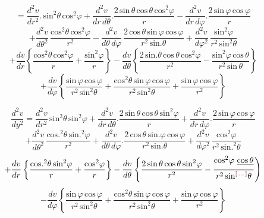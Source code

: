 \documentclass[11pt,a4paper]{article}
\begin{document}
\[ = \frac{d^{2}v}{dr^{2}}.\,\text{sin}^{2}\theta\,\text{cos}^{2}\varphi + \frac{d^{2}v}{dr\,d\theta}.\frac{2\,\text{sin}\,\theta\,\text{cos}\,\theta\,\text{cos}^{2}\varphi}{r} - \frac{d^{2}v}{dr\,d\varphi}.\frac{2\,\text{sin}\,\varphi\,\text{cos}\,\varphi}{r} \]
\[ + \frac{d^{2}v}{d\theta^{2}}\,\frac{\text{cos}^{2}\theta\,\text{cos}^{2}\varphi}{r^{2}} - \frac{d^{2}v}{d\theta\,d\varphi}\,\frac{2\,\text{cos}\,\theta\,\text{sin}\,\varphi\,\text{cos}\,\varphi}{r^{2}\,\text{sin.}\theta} + \frac{d^{2}v}{d\varphi^{2}}\,\frac{\text{sin}^{2}\varphi}{r^{2}\,\text{sin}^{2}\theta} \]
\[ + \frac{dv}{dr}\left\{\frac{\text{cos}^{2}\theta\,\text{cos}^{2}\varphi}{r} + \frac{\text{sin}^{2}\varphi}{r}\right\} - \frac{dv}{d\theta}\left\{\frac{2\,\text{sin.}\theta\,\text{cos}\,\theta\,\text{cos}^{2}\varphi}{r^{2}} - \frac{\text{sin}^{2}\varphi\,\text{cos}\,\theta}{r^{2}\,\text{sin}\,\theta}\right\} \]
\[ + \frac{dv}{d\varphi}\left\{\frac{\text{sin}\,\varphi\,\text{cos}\,\varphi}{r^{2}\,\text{sin}^{2}\theta} + \frac{\text{cos}^{2}\theta\,\text{sin}\,\varphi\,\text{cos}\,\varphi}{r^{2}\,\text{sin}^{2}\theta} + \frac{\text{sin}\,\varphi\,\text{cos}\,\varphi}{r^{2}}\right\} \]

\[ \frac{d^{2}v}{dy^{2}} = \frac{d^{2}v}{dr^{2}}\,\text{sin}^{2}\theta\,\text{sin}^{2}\varphi + \frac{d^{2}v}{dr\,d\theta}.\frac{2\,\text{sin}\,\theta\,\text{cos}\,\theta\,\text{sin}^{2}\varphi}{r} + \frac{d^{2}v}{dr\,d\varphi}.\frac{2\,\text{sin}\,\varphi\,\text{cos}\,\varphi}{r} \]
\[ + \frac{d^{2}v}{d\theta^{2}}\,\frac{\text{cos.}^{2}\theta\,\text{sin.}^{2}\varphi}{r^{2}} + \frac{d^{2}v}{d\theta\,d\varphi}.\frac{2\,\text{cos}\,\theta\,\text{sin.}\varphi\,\text{cos}\,\varphi}{r^{2}\,\text{sin.}\theta} + \frac{d^{2}v}{d\varphi^{2}}\,\frac{\text{cos}^{2}\varphi}{r^{2}\,\text{sin.}^{2}\theta} \]
\[ + \frac{dv}{dr}\left\{\frac{\text{cos.}^{2}\theta\,\text{sin}^{2}\varphi}{r} + \frac{\text{cos}^{2}\varphi}{r}\right\} - \frac{dv}{d\theta}\left\{\frac{2\,\text{sin}\,\theta\,\text{cos}\,\theta\,\text{sin}^{2}\varphi}{r^{2}} - \frac{\text{cos}^{2}\varphi\ \struck{\text{cos}\,\theta}}{r^{2}\,\text{sin}^{\ill{}}\theta}\right) \]
\[ - \frac{dv}{d\varphi}\left\{\frac{\text{sin}\,\varphi\,\text{cos}\,\varphi}{r^{2}\,\text{sin}^{2}\theta} + \frac{\text{cos}^{2}\theta\,\text{sin}\,\varphi\,\text{cos}\,\varphi}{r^{2}\,\text{sin}^{2}\theta} + \frac{\text{sin}\,\varphi\,\text{cos}\,\varphi}{r^{2}}\right\} \]
\end{document}
